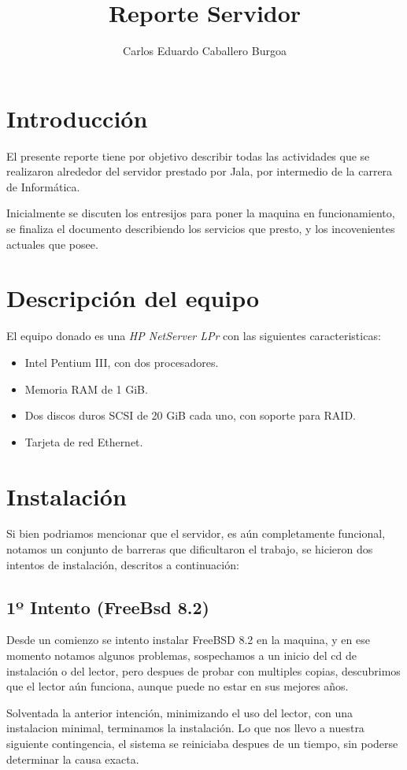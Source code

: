 \documentclass[letterpaper,11pt]{article}
\title{Reporte Servidor}
\author{Carlos Eduardo Caballero Burgoa}
\begin{document}
\maketitle

\section{Introducción}
El presente reporte tiene por objetivo describir todas las actividades que se
realizaron alrededor del servidor prestado por Jala, por intermedio de la
carrera de Informática.

Inicialmente se discuten los entresijos para poner la maquina en funcionamiento,
se finaliza el documento describiendo los servicios que presto, y los
incovenientes actuales que posee.

\section{Descripción del equipo}
El equipo donado es una \emph{HP NetServer LPr} con las siguientes
caracteristicas:
\begin{itemize}
\item Intel Pentium III, con dos procesadores.
\item Memoria RAM de 1 GiB.
\item Dos discos duros SCSI de 20 GiB cada uno, con soporte para RAID.
\item Tarjeta de red Ethernet.
\end{itemize}

\section{Instalación}
Si bien podriamos mencionar que el servidor, es aún completamente funcional,
notamos un conjunto de barreras que dificultaron el trabajo, se hicieron dos
intentos de instalación, descritos a continuación:

\subsection{1º Intento (FreeBsd 8.2)}
Desde un comienzo se intento instalar FreeBSD 8.2 en la maquina, y en ese
momento notamos algunos problemas, sospechamos a un inicio del cd de instalación
o del lector, pero despues de probar con multiples copias, descubrimos que el
lector aún funciona, aunque puede no estar en sus mejores años.

Solventada la anterior intención, minimizando el uso del lector, con una
instalacion minimal, terminamos la instalación. Lo que nos llevo a nuestra
siguiente contingencia, el sistema se reiniciaba despues de un tiempo, sin
poderse determinar la causa exacta.
\end{document}
